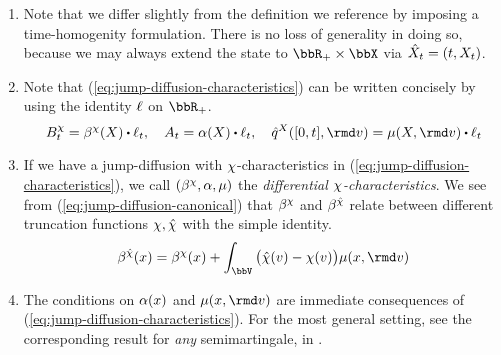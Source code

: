 \begin{remark}
  \label{remark:jump-diffusions}
  \begin{enumerate}[label=(\alph*)]
    \item
      Note that we differ slightly from the definition we reference by imposing a time-homogenity formulation.
      There is no loss of generality in doing so, because we may always extend the state to $\bbR_+ \times \stateSpace$ via $\hat{X}_t = (t, X_t)$.
    \item
      Note that (\ref{eq:jump-diffusion-characteristics}) can be written concisely by using the identity $\ell$ on $\bbR_+$.
      \[
        B^\trunc_t = \affDrift^\trunc(\X) \shortInt \leb_t, \quad
        A_t = \affDiff(\X) \shortInt \leb_t, \quad
        \predproj{\jumpMeas^\X}([0,t],\rmd\markVar) = \affJump(\X, \rmd\markVar) \shortInt \leb_t
      \]
    \item
      \label{remark:characteristic-switch}
      If we have a jump-diffusion with $\chi$-characteristics in (\ref{eq:jump-diffusion-characteristics}), we call $(\beta^\chi, \alpha, \mu)$ the \emph{differential $\chi$-characteristics}.
      We see from (\ref{eq:jump-diffusion-canonical}) that $\beta^\chi$ and $\beta^{\hat{\chi}}$ relate between different truncation functions $\chi, \hat{\chi}$ with the simple identity.
      \begin{equation}
        \label{eq:affDrift-relationship}
        \affDrift^{\hat\trunc}(\stateVar) = \affDrift^\trunc(\stateVar) + \int_\vecSpace \big(\hat\trunc(\markVar) - \trunc(\markVar) \big) \affJump(\stateVar, \rmd\markVar)
      \end{equation}
    \item
      The conditions on $\alpha(x)$ and $\affJump(\stateVar, \rmd\markVar)$ are immediate consequences of (\ref{eq:jump-diffusion-characteristics}).
      For the most general setting, see the corresponding result for \emph{any} semimartingale, in \cite[Proposition II.2.9]{jacod2003}.
  \end{enumerate}
\end{remark}
